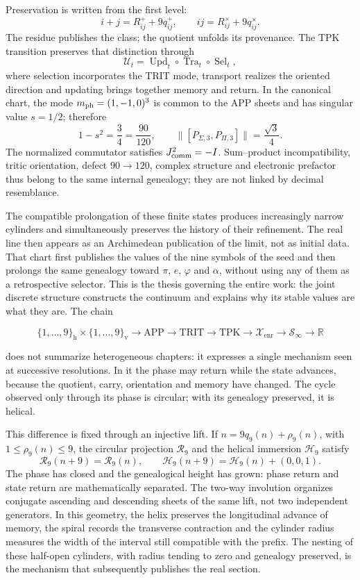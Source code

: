 Preservation is written from the first level:
\[
i+j=R^+_{ij}+9q^+_{ij},
\qquad
ij=R^\times_{ij}+9q^\times_{ij}.
\]
The residue publishes the class; the quotient unfolds its provenance. The
TPK transition preserves that distinction through
\[
\mathcal U_t=
\operatorname{Upd}_t\circ
\operatorname{Tra}_t\circ
\operatorname{Sel}_t,
\]
where selection incorporates the TRIT mode, transport realizes the
oriented direction and updating brings together memory and return. In the canonical
chart, the mode \(m_{\rm ph}=(1,-1,0)^3\) is common to the APP sheets and has
singular value \(s=1/2\); therefore
\[
1-s^2=\frac34=\frac{90}{120},
\qquad
\bigl\|[P_{\Sigma,3},P_{\Pi,3}]\bigr\|
=\frac{\sqrt3}{4}.
\]
The normalized commutator satisfies \(J_{\rm comm}^2=-I\). Sum--product
incompatibility, tritic orientation, defect \(90\to120\), complex
structure and electronic prefactor thus belong to the same internal
genealogy; they are not linked by decimal resemblance.

The compatible prolongation of these finite states produces increasingly
narrow cylinders and simultaneously preserves the history of their refinement.
The real line then appears as an Archimedean publication of the limit, not
as initial data. That chart first publishes the values of the nine
symbols of the seed and then prolongs the same genealogy toward
\(\pi\), \(e\), \(\varphi\) and \(\alpha\), without using any of them as a
retrospective selector. This is the thesis governing the entire work: the
joint discrete structure constructs the continuum and explains why its
stable values are what they are. The chain

\[
\{1,\ldots,9\}_{\mathrm h}\times\{1,\ldots,9\}_{\mathrm v}
\longrightarrow \mathrm{APP}\longrightarrow\mathrm{TRIT}
\longrightarrow\mathrm{TPK}\longrightarrow\mathcal X_{\mathrm{enr}}
\longrightarrow\mathcal S_\infty
\longrightarrow\mathbb R
\]

does not summarize heterogeneous chapters: it expresses a single mechanism seen at
successive resolutions. In it the phase may return while the state advances,
because the quotient, carry, orientation and memory have changed. The
cycle observed only through its phase is circular; with its genealogy preserved, it is
helical.

This difference is fixed through an injective lift. If
\(n=9q_9(n)+\rho_9(n)\), with \(1\leq\rho_9(n)\leq9\), the circular projection
\(\mathcal R_9\) and the helical immersion \(\mathcal H_9\) satisfy
\[
\mathcal R_9(n+9)=\mathcal R_9(n),\qquad
\mathcal H_9(n+9)=\mathcal H_9(n)+(0,0,1).
\]
The phase has closed and the genealogical height has grown: phase return and
state return are mathematically separated. The two-way involution
organizes conjugate ascending and descending sheets of the same lift, not
two independent generators. In this geometry, the helix preserves the
longitudinal advance of memory, the spiral records the transverse
contraction and the cylinder radius measures the width of the interval still
compatible with the prefix. The nesting of these half-open cylinders,
with radius tending to zero and genealogy preserved, is the mechanism that
subsequently publishes the real section.

